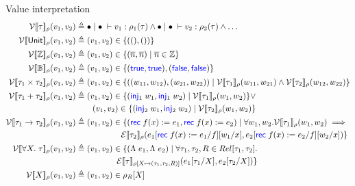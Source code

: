 \documentclass[twoside,11pt,openright]{report}
\theoremstyle{definition}
\newcommand{\Keyword}[1]{{\color{blue} \mathsf{#1}}}
\newcommand{\var}{x}
\newcommand{\expr}{e}
\newcommand{\val}{v}
\newcommand{\valB}{w}
\newcommand{\TT}{()}
\newcommand{\Num}[1]{\overline{#1}}
\newcommand{\True}{\Keyword{true}}
\newcommand{\False}{\Keyword{false}}
\newcommand{\Inj}[1]{\Keyword{inj}_{#1}\;}
\newcommand{\Tvar}{X}
\newcommand{\Tlam}{\Lambda\;}
\newcommand{\subst}[3]{#1{\left[#3 \middle/ #2 \right]}}
\newcommand{\Tunit}{\mathsf{Unit}}
\newcommand{\Tint}{\mathbb{Z}}
\newcommand{\Tbool}{\mathbb{B}}
\newcommand{\Tprod}[2]{#1 \times #2}
\newcommand{\Tsum}[2]{#1 + #2}
\newcommand{\Tfunc}[2]{#1 \rightarrow #2}
\newcommand{\Tall}[2]{\forall #1.\; #2}
\newcommand{\typ}{\tau}
\newcommand{\empvenv}{\bullet}
\newcommand{\emptenv}{\bullet}
\newcommand{\jdg}[4]{#1 \; | \; #2 \; \vdash #3 : #4}
\newcommand{\ValInp}[2]{\mathcal{V} \llbracket #1 \rrbracket_{#2}}
\newcommand{\ValInpGen}[2]{\ValInp{#1}{#2}(\val_1, \val_2)}
\newcommand{\ExpInp}[2]{\mathcal{E} \llbracket #1 \rrbracket_{#2}}
\newcommand{\map}[2]{#1 \mapsto #2}
\begin{document}
Value interpretation
\begin{align*}
  \ValInpGen{\typ}{\rho}    &\triangleq \jdg{\emptenv}{\empvenv}{\val_1}{\rho_1(\typ)} \land \jdg{\emptenv}{\empvenv}{\val_2}{\rho_2(\typ)} \land \dots\\
  \ValInpGen{\Tunit}{\rho}  &\triangleq (\val_1, \val_2) \in \{(\TT, \TT)\}\\
  \ValInpGen{\Tint}{\rho}   &\triangleq (\val_1, \val_2) \in \{(\Num{n}, \Num{n}) \mid \Num{n} \in \Tint\}\\
  \ValInpGen{\Tbool}{\rho}  &\triangleq (\val_1, \val_2) \in \{(\True, \True), (\False, \False)\}\\
  \ValInpGen{\Tprod{\typ_1}{\typ_2}}{\rho}  &\triangleq (\val_1, \val_2) \in \{((\valB_{11}, \valB_{12}), (\valB_{21}, \valB_{22})) \mid \ValInp{\typ_1}{\rho}(\valB_{11}, \valB_{21}) \land \ValInp{\typ_2}{\rho}(\valB_{12}, \valB_{22})\}\\
  \ValInpGen{\Tsum{\typ_1}{\typ_2}}{\rho}   &\triangleq 
  \begin{aligned}[t]
    (\val_1, \val_2) \in \{(\Inj{1} \valB_1, \Inj{1} \valB_2) \mid \ValInp{\typ_1}{\rho}(\valB_1, \valB_2)\} \lor \\
    (\val_1, \val_2) \in \{(\Inj{2} \valB_1, \Inj{2} \valB_2) \mid \ValInp{\typ_2}{\rho}(\valB_1, \valB_2)\}
  \end{aligned}\\
  \ValInpGen{\Tfunc{\typ_1}{\typ_2}}{\rho}  &\triangleq 
  \begin{aligned}[t]
    (\val_1, \val_2) \in \{(\Rec f \var := \expr_1, \Rec f \var := \expr_2) \mid \forall \valB_1, \valB_2 . \ValInp{\typ_1}{\rho}(\valB_{1}, \valB_{2}) \implies\\
    \ExpInp{\typ_2}{\rho}(\subst{\subst{\expr_1}{f}{\Rec f \var := \expr_1}}{\var}{\valB_1}, \subst{\subst{\expr_2}{f}{\Rec f \var := \expr_2}}{\var}{\valB_2})\}
  \end{aligned}\\
  \ValInpGen{\Tall{\Tvar}{\typ}}{\rho}  &\triangleq 
  \begin{aligned}[t]
    (\val_1, \val_2) \in \{(\Tlam \expr_1, \Tlam \expr_2) \mid \forall \typ_1, \typ_2, R \in Rel[\typ_1, \typ_2] .\\
    \ExpInp{\typ}{\rho[\map{\Tvar}{(\typ_1, \typ_2, R)}]}(\subst{\expr_1}{\Tvar}{\typ_1}, \subst{\expr_2}{\Tvar}{\typ_2})\}
  \end{aligned}\\
  \ValInpGen{\Tvar}{\rho} &\triangleq (\val_1, \val_2) \in \rho_R[\Tvar]\\
\end{align*}
\end{document}
